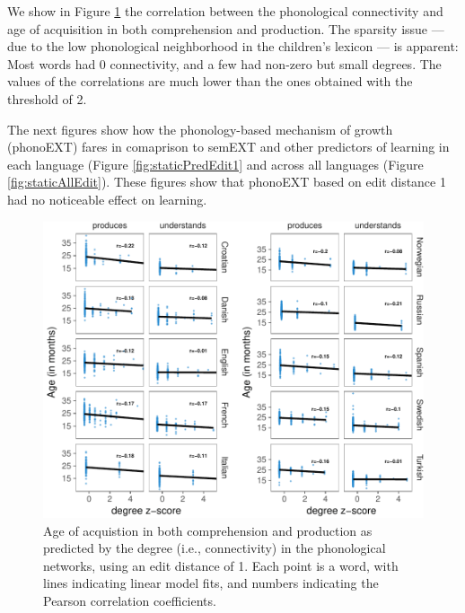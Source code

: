 \documentclass[english,floatsintext,man]{apa6}
\theoremstyle{definition}
\theoremstyle{definition}
\theoremstyle{definition}
\theoremstyle{remark}
\begin{document}
We show in Figure \ref{fig:corrPlot} the correlation between the
phonological connectivity and age of acquisition in both comprehension
and production. The sparsity issue --- due to the low phonological
neighborhood in the children's lexicon --- is apparent: Most words had 0
connectivity, and a few had non-zero but small degrees. The values of
the correlations are much lower than the ones obtained with the
threshold of 2.

The next figures show how the phonology-based mechanism of growth
(phonoEXT) fares in comaprison to semEXT and other predictors of
learning in each language (Figure \ref{fig:staticPredEdit1} and across
all languages (Figure \ref{fig:staticAllEdit}). These figures show that
phonoEXT based on edit distance 1 had no noticeable effect on learning.

\begin{figure}[!h]
\includegraphics[width=\textwidth]{ms_files/figure-latex/corrPlot-1} \caption{Age of acquistion in both comprehension and production as predicted by the degree (i.e., connectivity) in the phonological networks, using an edit distance of 1. Each point is a word, with lines indicating linear model fits, and numbers indicating the Pearson correlation coefficients.}\label{fig:corrPlot}
\end{figure}
\end{document}
